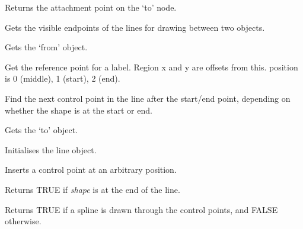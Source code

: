
Returns the attachment point on the `to' node.



Gets the visible endpoints of the lines for drawing between two objects.



Gets the `from' object.



Get the reference point for a label. Region x and y are offsets from this.
position is 0 (middle), 1 (start), 2 (end).



Find the next control point in the line after the start/end point,
depending on whether the shape is at the start or end.



Gets the `to' object.



Initialises the line object.



Inserts a control point at an arbitrary position.



Returns TRUE if {\it shape} is at the end of the line.



Returns TRUE if a spline is drawn through the control points, and FALSE otherwise.

